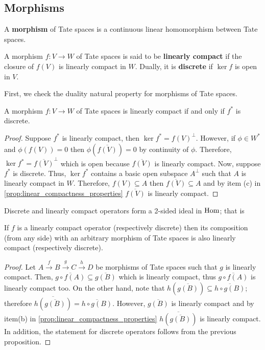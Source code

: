 \subsection*{Morphisms}
A \textbf{morphism} of Tate spaces is a continuous linear homomorphism between Tate spaces.
\begin{definition}\label{def:linearly-compact-and-discrete-morphisms}
	A morphism $f\colon V\to W$ of Tate spaces is said to be \textbf{linearly compact} if the closure of $f(V)$ is linearly compact in $W$. Dually, it is \textbf{discrete} if $\ker f$ is open in $V$. 
\end{definition}
First, we check the duality natural property for morphisms of Tate spaces.
\begin{proposition}\label{prop:duality-discrete-compact-maps}
	A morphism $f\colon V\to W$ of Tate spaces is linearly compact if and only if $f^{*}$ is discrete.
\end{proposition}
\begin{proof}
	Suppose $f^{*}$ is linearly compact, then $\ker f^{*} = f(V)^{\perp}$. However, if $\phi\in W^{*}$ and $\phi(f(V)) = 0$ then $\phi(\overline{f(V)}) = 0$ by continuity of $\phi$. Therefore, $\ker f^{*} = \overline{f(V)}^{\perp}$ which is open because $\overline{f(V)}$ is linearly compact. Now, suppose $f^{*}$ is discrete. Thus, $\ker f^{*}$ contains a basic open subspace $A^{\perp}$ such that $A$ is linearly compact in $W$. Therefore, $f(V)\subseteq A$ then $\overline{f(V)} \subseteq A$ and by item (c) in \cref{prop:linear_compactness_properties} $\overline{f(V)}$ is linearly compact.
\end{proof}
Discrete and linearly compact operators form a 2-sided ideal in $\operatorname{Hom}$; that is
\begin{proposition}\label{prop:compact-and-discrete-2-sided-ideal}
	If $f$ is a linearly compact operator (respectively discrete) then its composition (from any side) with an arbitrary morphism of Tate spaces is also linearly compact (respectively discrete). 
\end{proposition}
\begin{proof}
	Let $A \xrightarrow{f} B \xrightarrow{g} C \xrightarrow{h} D$ be morphisms of Tate spaces such that $g$ is linearly compact. Then, $\overline{g\circ f(A)} \subseteq \overline{g(B)}$ which is linearly compact, thus $\overline{g\circ f(A)}$ is linearly compact too. On the other hand, note that $h(\overline{g(B)}) \subseteq \overline{h\circ g(B)}$; therefore $\overline{h(\overline{g(B)})} = \overline{h\circ g(B)}$. However, $\overline{g(B)}$ is linearly compact and by item(b) in \cref{prop:linear_compactness_properties} $\overline{h(\overline{g(B)})}$ is linearly compact. In addition, the statement for discrete operators follows from the previous proposition.
\end{proof}
